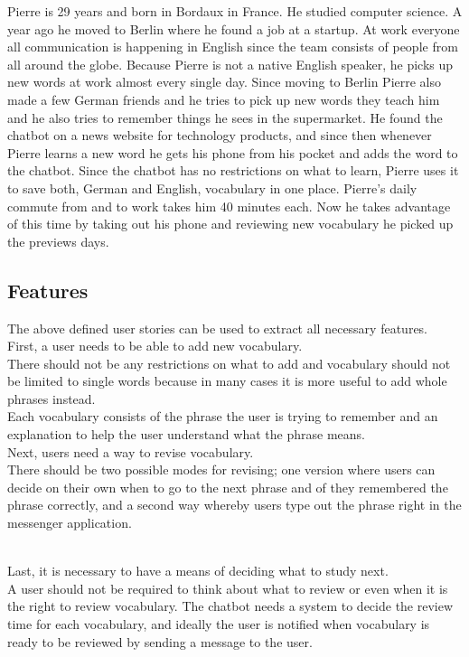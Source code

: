 Pierre is 29 years and born in Bordaux in France.
He studied computer science.
A year ago he moved to Berlin where he found a job at a startup.
At work everyone all communication is happening in English since the team consists of people from all around the globe.
Because Pierre is not a native English speaker, he picks up new words at work almost every single day.
Since moving to Berlin Pierre also made a few German friends and he tries to pick up new words they teach him
and he also tries to remember things he sees in the supermarket.
He found the chatbot on a news website for technology products,
and since then whenever Pierre learns a new word he gets his phone from his pocket and adds the word to the chatbot.
Since the chatbot has no restrictions on what to learn, Pierre uses it to save both, German and English, vocabulary in one place.
Pierre's daily commute from and to work takes him 40 minutes each.
Now he takes advantage of this time by taking out his phone and reviewing new vocabulary he picked up the previews days.
\\


\subsection{Features}

The above defined user stories can be used to extract all necessary features.
\\

First, a user needs to be able to add new vocabulary.
\\
There should not be any restrictions on what to add
and vocabulary should not be limited to single words because in many cases it is more useful
to add whole phrases instead.
\\
Each vocabulary consists of the phrase the user is trying to remember
and an explanation to help the user understand what the phrase means.
\\

Next, users need a way to revise vocabulary.
\\
There should be two possible modes for revising;
one version where users can decide on their own when to go to the next phrase
and of they remembered the phrase correctly,
and a second way whereby users type out the phrase right in the messenger application.

\\
Last, it is necessary to have a means of deciding what to study next.
\\
A user should not be required to think about what to review or even when it is the right to review vocabulary.
The chatbot needs a system to decide the review time for each vocabulary,
and ideally the user is notified when vocabulary is ready to be reviewed by sending a message to the user.
\\



